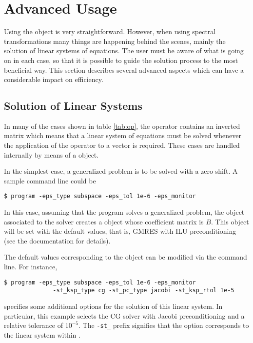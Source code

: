 \section{Advanced Usage}

Using the  object is very straightforward. However, when using spectral transformations many things are happening behind the scenes, mainly the solution of linear systems of equations. The user must be aware of what is going on in each case, so that it is possible to guide the solution process to the most beneficial way. This section describes several advanced aspects which can have a considerable impact on efficiency.

\subsection{Solution of Linear Systems}
\label{sec:lin}

	In many of the cases shown in table \ref{tab:op}, the operator contains an inverted matrix which means that a linear system of equations must be solved whenever the application of the operator to a vector is required. These cases are handled internally by means of a  object.

	In the simplest case, a generalized problem is to be solved with a zero shift. A sample command line could be
\begin{Verbatim}[fontsize=\small]
	$ program -eps_type subspace -eps_tol 1e-6 -eps_monitor
\end{Verbatim}
In this case, assuming that the program solves a generalized problem, the  object associated to the  solver creates a  object whose coefficient matrix is $B$. This  object will be set with the default values, that is, GMRES with ILU preconditioning (see the \petsc{} documentation for details).

	The default values corresponding to the  object can be modified via the command line. For instance,
\begin{Verbatim}[fontsize=\small]
	$ program -eps_type subspace -eps_tol 1e-6 -eps_monitor
	          -st_ksp_type cg -st_pc_type jacobi -st_ksp_rtol 1e-5
\end{Verbatim}
specifies some additional options for the solution of this linear system. In particular, this example selects the CG solver with Jacobi preconditioning and a relative tolerance of $10^{-5}$. The \Verb!-st_! prefix signifies that the option corresponds to the linear system within .

